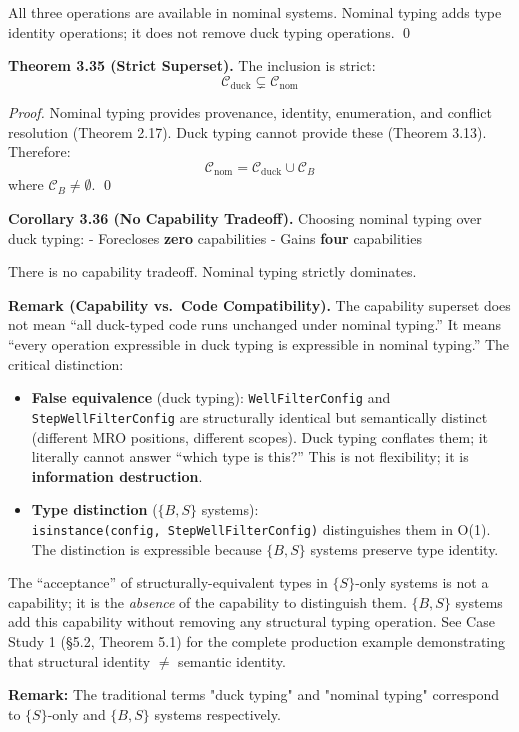 All three operations are available in nominal systems. Nominal typing
adds type identity operations; it does not remove duck typing
operations. \qed

\textbf{Theorem 3.35 (Strict Superset).} The inclusion is strict:
\[\mathcal{C}_{\text{duck}} \subsetneq \mathcal{C}_{\text{nom}}\]

\emph{Proof.} Nominal typing provides provenance, identity, enumeration,
and conflict resolution (Theorem 2.17). Duck typing cannot provide these
(Theorem 3.13). Therefore:
\[\mathcal{C}_{\text{nom}} = \mathcal{C}_{\text{duck}} \cup \mathcal{C}_B\]
where \(\mathcal{C}_B \neq \emptyset\). \qed

\textbf{Corollary 3.36 (No Capability Tradeoff).} Choosing nominal
typing over duck typing: - Forecloses \textbf{zero} capabilities - Gains
\textbf{four} capabilities

There is no capability tradeoff. Nominal typing strictly dominates.

\textbf{Remark (Capability vs.~Code Compatibility).} The capability
superset does not mean ``all duck-typed code runs unchanged under
nominal typing.'' It means ``every operation expressible in duck typing
is expressible in nominal typing.'' The critical distinction:

\begin{itemize}
\item
  \textbf{False equivalence} (duck typing): \texttt{WellFilterConfig}
  and \texttt{StepWellFilterConfig} are structurally identical but
  semantically distinct (different MRO positions, different scopes).
  Duck typing conflates them; it literally cannot answer ``which type
  is this?'' This is not flexibility; it is \textbf{information
  destruction}.
\item
  \textbf{Type distinction} ($\{B,S\}$ systems):
  \texttt{isinstance(config,\ StepWellFilterConfig)} distinguishes them
  in O(1). The distinction is expressible because $\{B,S\}$ systems
  preserve type identity.
\end{itemize}

The ``acceptance'' of structurally-equivalent types in $\{S\}$-only systems is not a
capability; it is the \emph{absence} of the capability to distinguish
them. $\{B,S\}$ systems add this capability without removing any structural
typing operation. See Case Study 1 (\S{}5.2, Theorem 5.1) for the complete
production example demonstrating that structural identity $\neq$ semantic
identity.

\textbf{Remark:} The traditional terms "duck typing" and "nominal typing" correspond to $\{S\}$-only and $\{B,S\}$ systems respectively.

